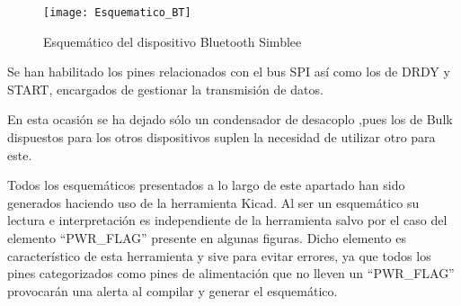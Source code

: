 \begin{figure} [h]
    \centering
    \texttt{[image: Esquematico\_BT]}
    \caption{Esquemático del dispositivo Bluetooth Simblee}
    \label{fig:Esquematico_BT}
\end{figure}

Se han habilitado los pines relacionados con el bus \acrshort{SPI} así como los de DRDY y START, encargados de gestionar la transmisión de datos.

En esta ocasión se ha dejado sólo un condensador de desacoplo ,pues los de Bulk dispuestos para los otros dispositivos suplen la necesidad de utilizar otro para este.

Todos los esquemáticos presentados a lo largo de este apartado han sido generados haciendo uso de la herramienta Kicad. Al ser un esquemático su lectura e interpretación es independiente de la herramienta salvo por el caso del elemento ``PWR\_FLAG'' presente en algunas figuras. Dicho elemento es característico de esta herramienta y sive para evitar errores, ya que todos los pines categorizados como pines de alimentación que no lleven un ``PWR\_FLAG'' provocarán una alerta al compilar y generar el esquemático.
